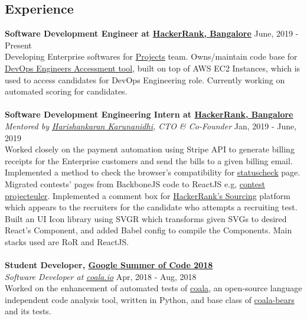 \documentclass[margin, centered]{res}
\begin{document}
\begin{resume}
    \section{Experience}
    \textbf{Software Development Engineer at \href{https://www.hackerrank.com}{HackerRank, Bangalore}} \hfill June, 2019 - Present \\
    Developing Enterprise softwares for \href{https://www.hackerrank.com/products/projects}{Projects} team. Owns/maintain code base for \href{https://www.hackerrank.com/products/projects#role5}{DevOps Engineers Accessment tool},
    built on top of AWS EC2 Instances, which is used to access candidates for DevOps Engineering role. Currently working on automated scoring for candidates.\\
    \\
    \textbf{Software Development Engineering Intern at \href{https://www.hackerrank.com}{HackerRank, Bangalore}} \\
    \emph{Mentored by \href{https://www.hackerrank.com/about-us/our-team/}{Harishankaran Karunanidhi}\footnotesize{, CTO \& Co-Founder}} \hfill Jan, 2019 - June, 2019 \\
    Worked closely on the payment automation using Stripe API to generate billing receipts for
    the Enterprise customers and send the bills to a given billing email. Implemented a method to check the browser's compatibility
    for \href{https://www.hackerrank.com/statuscheck}{statuscheck} page. Migrated contests' pages from
    BackboneJS code to ReactJS e.g, \href{https://www.hackerrank.com/projecteuler/}{contest projecteuler}.
    Implemented a comment box for \href{https://www.hackerrank.com/work}{HackerRank's Sourcing} platform
    which appears to the recruiters for the candidate who attempts a recruiting test. Built an UI Icon library
    using SVGR which transforms given SVGs to desired React's Component, and added Babel config to compile
    the Components. Main stacks used are RoR and ReactJS. \\
    \\
    \textbf{Student Developer, \href{https://summerofcode.withgoogle.com/}{Google Summer of Code 2018}} \\
    \emph{Software Developer at \href{https://coala.io/}{coala.io}} \hfill Apr, 2018 - Aug, 2018 \\
    Worked on the enhancement of automated tests of \href{https://github.com/coala/coala}{coala},
    an open-source language independent code analysis tool, written in Python, and base
    class of \href{https://github.com/coala/coala-bears}{coala-bears} and its tests.

\end{resume}
\end{document}
